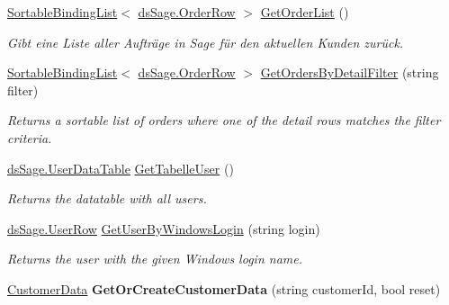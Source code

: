 \begin{DoxyCompactItemize}
\item 
\hyperlink{class_products_1_1_common_1_1_sortable_binding_list}{Sortable\+Binding\+List}$<$ \hyperlink{class_products_1_1_data_1_1ds_sage_1_1_order_row}{ds\+Sage.\+Order\+Row} $>$ \hyperlink{class_products_1_1_data_1_1_data_service_abbfadbebe8c2eb431136a40e400a63f6}{Get\+Order\+List} ()
\begin{DoxyCompactList}\small\item\em Gibt eine Liste aller Aufträge in Sage für den aktuellen Kunden zurück. \end{DoxyCompactList}\item 
\hyperlink{class_products_1_1_common_1_1_sortable_binding_list}{Sortable\+Binding\+List}$<$ \hyperlink{class_products_1_1_data_1_1ds_sage_1_1_order_row}{ds\+Sage.\+Order\+Row} $>$ \hyperlink{class_products_1_1_data_1_1_data_service_adcacafeb8947fd73c9874986000a5d1f}{Get\+Orders\+By\+Detail\+Filter} (string filter)
\begin{DoxyCompactList}\small\item\em Returns a sortable list of orders where one of the detail rows matches the filter criteria. \end{DoxyCompactList}\item 
\hyperlink{class_products_1_1_data_1_1ds_sage_1_1_user_data_table}{ds\+Sage.\+User\+Data\+Table} \hyperlink{class_products_1_1_data_1_1_data_service_a3afa9e3d7c6529e90b8be49c99652a3d}{Get\+Tabelle\+User} ()
\begin{DoxyCompactList}\small\item\em Returns the datatable with all users. \end{DoxyCompactList}\item 
\hyperlink{class_products_1_1_data_1_1ds_sage_1_1_user_row}{ds\+Sage.\+User\+Row} \hyperlink{class_products_1_1_data_1_1_data_service_ab28cda1ab514ca29e72af6882e8a6408}{Get\+User\+By\+Windows\+Login} (string login)
\begin{DoxyCompactList}\small\item\em Returns the user with the given Windows login name. \end{DoxyCompactList}\item 
\hyperlink{class_products_1_1_data_1_1_customer_data}{Customer\+Data} {\bfseries Get\+Or\+Create\+Customer\+Data} (string customer\+Id, bool reset)\hypertarget{class_products_1_1_data_1_1_data_service_abec796ebbe83cc0904ff60e500ecbde0}{}\label{class_products_1_1_data_1_1_data_service_abec796ebbe83cc0904ff60e500ecbde0}


\end{DoxyCompactItemize}
